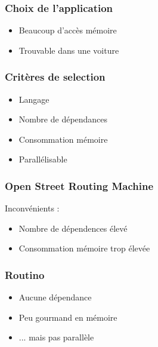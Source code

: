 \begin{frame}
\frametitle{Choix de l'application}
\begin{itemize}
  \item Beaucoup d'accès mémoire
    \vspace{1em}
  \item Trouvable dans une voiture
\end{itemize}
\end{frame}

\begin{frame}
\frametitle{Critères de selection}
\begin{itemize}
  \item Langage
    \vspace{1em}
  \item Nombre de dépendances
    \vspace{1em}
  \item Consommation mémoire
    \vspace{1em}
  \item Parallélisable
\end{itemize}
\end{frame}


\begin{frame}
\frametitle{Open Street Routing Machine}
Inconvénients :
\begin{itemize}
\item Nombre de dépendences élevé
    \vspace{1em}
\item Consommation mémoire trop élevée
\end{itemize}
\end{frame}


\begin{frame}
\frametitle{Routino}
\begin{itemize}
\item Aucune dépendance
    \vspace{1em}
\item Peu gourmand en mémoire
    \vspace{1em}
\item ... mais pas parallèle
\end{itemize}
\end{frame}

